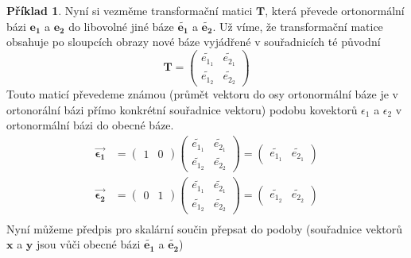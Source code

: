 \documentclass[a5paper,12pt]{amsbook}
\theoremstyle{definition}
\newtheorem{example}{Příklad}[chapter]
\newcommand{\myvec}[1]{\bm{#1}}
\newcommand{\mycoord}[1]{\overrightarrow{\mathbf{#1}}}
\newcommand{\mymatrix}[1]{\mathbf{#1}}
\begin{document}
\begin{example}
Nyní si vezměme transformační matici $\mymatrix{T}$, která převede ortonormální bázi
$\myvec{e_1}$ a $\myvec{e_2}$ do libovolné jiné báze $\myvec{\widetilde{e_1}}$
a $\myvec{\widetilde{e_2}}$. Už víme, že transformační matice obsahuje po sloupcích obrazy nové
báze vyjádřené v souřadnicích té původní
\begin{equation*}
\mymatrix{T} = \left(\begin{array}{cc}
\widetilde{e_{1_1}} & \widetilde{e_{2_1}} \\
\widetilde{e_{1_2}} & \widetilde{e_{2_2}}
\end{array}\right)
\end{equation*}
Touto maticí převedeme známou (průmět vektoru do osy ortonormální báze je v ortonorální
bázi přímo konkrétní souřadnice vektoru) podobu kovektorů $\epsilon_1$ a $\epsilon_2$
v ortonormální bázi do obecné báze.
\begin{equation*}
\begin{split}
\mycoord{\epsilon_1} &= 
\left(\begin{array}{cc}1 & 0\end{array}\right)
\left(\begin{array}{cc}
\widetilde{e_{1_1}} & \widetilde{e_{2_1}} \\
\widetilde{e_{1_2}} & \widetilde{e_{2_2}}
\end{array}\right) =
\left(\begin{array}{cc}\widetilde{e_{1_1}} & \widetilde{e_{2_1}}\end{array}\right) \\
\mycoord{\epsilon_2} &= 
\left(\begin{array}{cc}0 & 1\end{array}\right)
\left(\begin{array}{cc}
\widetilde{e_{1_1}} & \widetilde{e_{2_1}} \\
\widetilde{e_{1_2}} & \widetilde{e_{2_2}}
\end{array}\right) =
\left(\begin{array}{cc}\widetilde{e_{1_2}} & \widetilde{e_{2_2}}\end{array}\right) \\
\end{split}
\end{equation*}
Nyní můžeme předpis pro skalární součin přepsat do podoby (souřadnice vektorů $\myvec{x}$
a $\myvec{y}$ jsou vůči obecné bázi $\myvec{\widetilde{e_1}}$ a $\myvec{\widetilde{e_2}}$)
\begin{equation*}
\begin{split}

\end{split}
\end{equation*}
\end{example}
\end{document}
